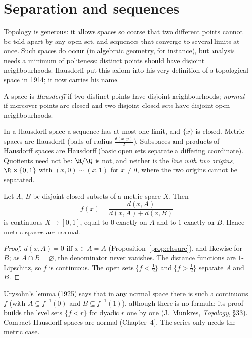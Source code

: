 \section{Separation and sequences}

Topology is generous: it allows spaces so coarse that two different points cannot be told apart by any open set, and
sequences that converge to several limits at once. Such spaces do occur (in algebraic geometry, for instance), but analysis
needs a minimum of politeness: distinct points should have disjoint neighbourhoods. Hausdorff put this axiom into his very
definition of a topological space in 1914; it now carries his name.

\begin{definition}
A space is \emph{Hausdorff} if two distinct points have disjoint neighbourhoods; \emph{normal} if moreover points are closed and two disjoint
closed sets have disjoint open neighbourhoods.
\end{definition}

In a Hausdorff space a sequence has at most one limit, and $\{x\}$ is closed. Metric spaces are Hausdorff (balls of radius
$\frac{d(x,y)}2$). Subspaces and products of Hausdorff spaces are Hausdorff (basic open sets separate a differing coordinate). Quotients need not
be: $\R/\Q$ is not, and neither is the \emph{line with two origins}, $\R\times\{0,1\}$ with $(x,0)\sim(x,1)$ for $x\ne0$, where the two origins cannot be
separated.

\begin{proposition}\label{prop:urysohn}
Let $A$, $B$ be disjoint closed subsets of a metric space $X$. Then
\[
f(x)=\frac{d(x,A)}{d(x,A)+d(x,B)}
\]
is continuous $X\to[0,1]$, equal to $0$ exactly on $A$ and to $1$ exactly on $B$. Hence metric spaces are normal.
\end{proposition}
\begin{proof}
$d(x,A)=0$ iff $x\in\bar A=A$ (Proposition~\ref{prop:closure}), and likewise for $B$; as $A\cap B=\varnothing$, the denominator never vanishes. The distance
functions are $1$-Lipschitz, so $f$ is continuous. The open sets $\{f<\frac12\}$ and $\{f>\frac12\}$ separate $A$ and $B$.
\end{proof}

\begin{remark}
Urysohn's lemma (1925) says that in any normal space there is such a continuous $f$ (with $A\subseteq f^{-1}(0)$ and $B\subseteq f^{-1}(1)$), although there is no
formula; its proof builds the level sets $\{f<r\}$ for dyadic $r$ one by one (J.~Munkres, \emph{Topology}, \S33). Compact Hausdorff spaces are
normal (Chapter~4). The series only needs the metric case.
\end{remark}

